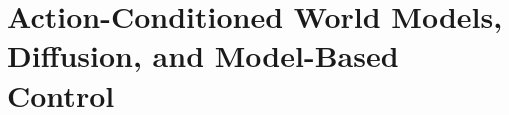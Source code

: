 \chapter{Action-Conditioned World Models, Diffusion, and Model-Based Control}
\label{ch:C06}










